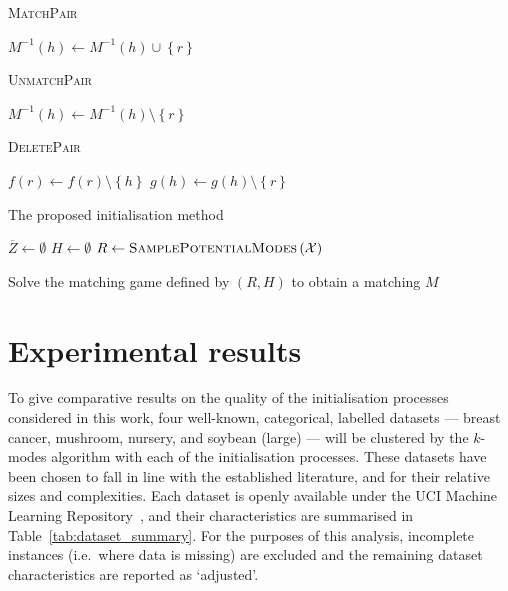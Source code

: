 \documentclass[smallextended]{svjour3}
\newcommand{\balg}{\begin{algorithm}[htbp]\DontPrintSemicolon}
\newcommand{\ealg}{\end{algorithm}}
\begin{document}
\balg%
    \caption{\textsc{MatchPair}}\label{alg:match}

    \(M^{-1}(h) \gets M^{-1}(h) \cup \left\{r\right\}\)\;
\ealg%

\balg%
    \caption{\textsc{UnmatchPair}}\label{alg:unmatch}

    \(M^{-1}(h) \gets M^{-1}(h) \setminus \left\{r\right\}\)\;
\ealg%

\balg%
    \caption{\textsc{DeletePair}}\label{alg:delete}

    \(f(r) \gets f(r) \setminus \left\{h\right\}\)\;
    \(g(h) \gets g(h) \setminus \left\{r\right\}\)\;
\ealg%

\balg%
    \caption{The proposed initialisation method}\label{alg:proposed_method}

    \(\overline Z \gets \emptyset\)\;
    \(H \gets \emptyset\)\;
    \(R \gets \textsc{SamplePotentialModes}\left(\mathcal{X}\right)\)\;



    Solve the matching game defined by \((R, H)\) to obtain a matching \(M\)\;
\ealg%


\section{Experimental results}\label{sec:results}
\graphicspath{{./img/}}

To give comparative results on the quality of the initialisation processes
considered in this work, four well-known, categorical, labelled datasets ---
breast cancer, mushroom, nursery, and soybean (large) --- will be clustered by
the \(k\)-modes algorithm with each of the initialisation processes. These
datasets have been chosen to fall in line with the established literature, and
for their relative sizes and complexities. Each dataset is openly available
under the UCI Machine Learning Repository~\cite{Dua2019}, and their
characteristics are summarised in Table~\ref{tab:dataset_summary}. For the
purposes of this analysis, incomplete instances (i.e.\ where data is missing)
are excluded and the remaining dataset characteristics are reported as
`adjusted'.
\end{document}
